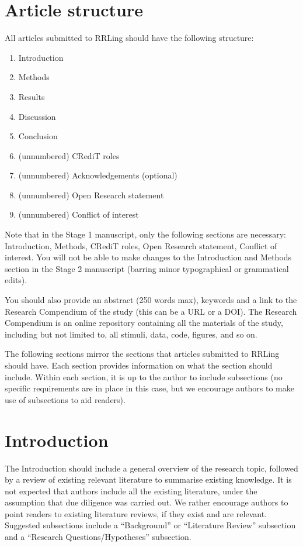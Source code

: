 \documentclass[
]{rrling}
\begin{document}
\section*{Article structure}\label{article-structure}

All articles submitted to RRLing should have the following structure:

\begin{enumerate}
\def\labelenumi{\arabic{enumi}.}
\item
  Introduction
\item
  Methods
\item
  Results
\item
  Discussion
\item
  Conclusion
\item
  (unnumbered) CRediT roles
\item
  (unnumbered) Acknowledgements (optional)
\item
  (unnumbered) Open Research statement
\item
  (unnumbered) Conflict of interest
\end{enumerate}

Note that in the Stage 1 manuscript, only the following sections are
necessary: Introduction, Methods, CRediT roles, Open Research statement,
Conflict of interest. You will not be able to make changes to the
Introduction and Methods section in the Stage 2 manuscript (barring
minor typographical or grammatical edits).

You should also provide an abstract (250 words max), keywords and a link
to the Research Compendium of the study (this can be a URL or a DOI).
The Research Compendium is an online repository containing all the
materials of the study, including but not limited to, all stimuli, data,
code, figures, and so on.

The following sections mirror the sections that articles submitted to
RRLing should have. Each section provides information on what the
section should include. Within each section, it is up to the author to
include subsections (no specific requirements are in place in this case,
but we encourage authors to make use of subsections to aid readers).

\section{Introduction}\label{introduction}

The Introduction should include a general overview of the research
topic, followed by a review of existing relevant literature to summarise
existing knowledge. It is not expected that authors include all the
existing literature, under the assumption that due diligence was carried
out. We rather encourage authors to point readers to existing literature
reviews, if they exist and are relevant. Suggested subsections include a
``Background'' or ``Literature Review'' subsection and a ``Research
Questions/Hypotheses'' subsection.
\end{document}
